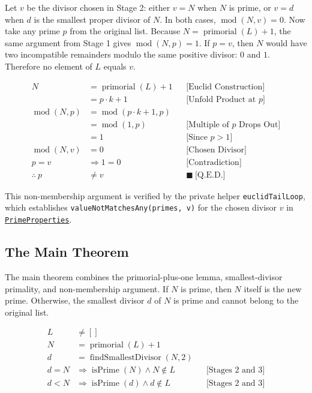 Let $v$ be the divisor chosen in Stage 2: either $v=N$ when $N$ is prime,
or $v=d$ when $d$ is the smallest proper divisor of $N$. In both cases,
$\operatorname{mod}(N,v)=0$. Now take any prime $p$ from the original
list. Because $N=\operatorname{primorial}(L)+1$, the same argument from
Stage 1 gives $\operatorname{mod}(N,p)=1$. If $p=v$, then $N$ would have
two incompatible remainders modulo the same positive divisor: $0$ and $1$.
Therefore no element of $L$ equals $v$.

\begin{equation*}
\begin{aligned}
N &= \operatorname{primorial}(L) + 1
&&\text{[Euclid Construction]} \\
  &= p \cdot k + 1
&&\text{[Unfold Product at }p\text{]} \\
\operatorname{mod}(N,p)
  &= \operatorname{mod}(p\cdot k+1,p) \\
  &= \operatorname{mod}(1,p)
&&\text{[Multiple of }p\text{ Drops Out]} \\
  &= 1
&&\text{[Since }p>1\text{]} \\
\operatorname{mod}(N,v)
  &= 0
&&\text{[Chosen Divisor]} \\
p=v
  &\Rightarrow 1=0
&&\text{[Contradiction]} \\
\therefore\ p &\ne v
&&\blacksquare\ \text{[Q.E.D.]}
\end{aligned}
\end{equation*}

This non-membership argument is verified by the private helper
\texttt{euclidTailLoop}, which establishes
\texttt{valueNotMatchesAny(primes, v)} for the chosen divisor $v$ in
\href{https://github.com/thiagomata/prime-numbers/blob/euclid-theorem-article-v1.0.0/src/main/scala/v1/chapter5/prime/properties/PrimeProperties.scala}{\texttt{PrimeProperties}}.

\subsection{The Main Theorem}
\label{sec:main-theorem}

The main theorem combines the primorial-plus-one lemma, smallest-divisor
primality, and non-membership argument. If $N$ is prime, then $N$ itself
is the new prime. Otherwise, the smallest divisor $d$ of $N$ is prime and
cannot belong to the original list.

\begin{equation*}
\begin{aligned}
L &\ne [] \\
N &= \operatorname{primorial}(L)+1 \\
d &= \operatorname{findSmallestDivisor}(N,2) \\
d=N
&\Rightarrow \operatorname{isPrime}(N)\land N\notin L
&&\text{[Stages 2 and 3]} \\
d < N
&\Rightarrow \operatorname{isPrime}(d)\land d\notin L
&&\text{[Stages 2 and 3]}
\end{aligned}
\end{equation*}

